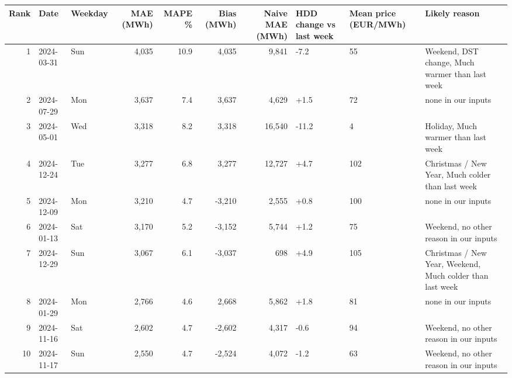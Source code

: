 \begin{tabular}{rllrrrrlll}
\toprule
Rank & Date & Weekday & MAE (MWh) & MAPE \% & Bias (MWh) & Naive MAE (MWh) & HDD change vs last week & Mean price (EUR/MWh) & Likely reason \\
\midrule
1 & 2024-03-31 & Sun & 4,035 & 10.9 & 4,035 & 9,841 & -7.2 & 55 & Weekend, DST change, Much warmer than last week \\
2 & 2024-07-29 & Mon & 3,637 & 7.4 & 3,637 & 4,629 & +1.5 & 72 & none in our inputs \\
3 & 2024-05-01 & Wed & 3,318 & 8.2 & 3,318 & 16,540 & -11.2 & 4 & Holiday, Much warmer than last week \\
4 & 2024-12-24 & Tue & 3,277 & 6.8 & 3,277 & 12,727 & +4.7 & 102 & Christmas / New Year, Much colder than last week \\
5 & 2024-12-09 & Mon & 3,210 & 4.7 & -3,210 & 2,555 & +0.8 & 100 & none in our inputs \\
6 & 2024-01-13 & Sat & 3,170 & 5.2 & -3,152 & 5,744 & +1.2 & 75 & Weekend, no other reason in our inputs \\
7 & 2024-12-29 & Sun & 3,067 & 6.1 & -3,037 & 698 & +4.9 & 105 & Christmas / New Year, Weekend, Much colder than last week \\
8 & 2024-01-29 & Mon & 2,766 & 4.6 & 2,668 & 5,862 & +1.8 & 81 & none in our inputs \\
9 & 2024-11-16 & Sat & 2,602 & 4.7 & -2,602 & 4,317 & -0.6 & 94 & Weekend, no other reason in our inputs \\
10 & 2024-11-17 & Sun & 2,550 & 4.7 & -2,524 & 4,072 & -1.2 & 63 & Weekend, no other reason in our inputs \\
\bottomrule
\end{tabular}
